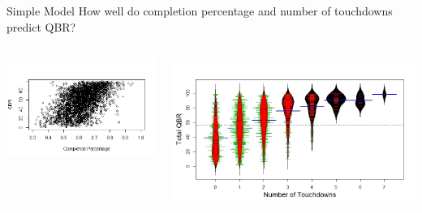 \documentclass{beamer}
\begin{document}
	\begin{frame}{Simple Model}
		How well do completion percentage and number of touchdowns predict QBR?
		\begin{columns}
			\begin{column}[t]{.6\textwidth}
				\includegraphics[scale=.45]{scatter1.jpeg}
			\end{column}
			\begin{column}[t]{.6\textwidth}
				\includegraphics[scale=.28]{scatter2.jpeg}
			\end{column}
		\end{columns}
	\end{frame}
\end{document}
